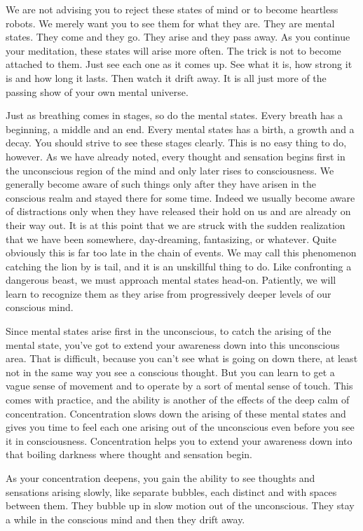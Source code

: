 We are not advising you to reject these states of mind or to become heartless
robots. We merely want you to see them for what they are. They are mental
states. They come and they go. They arise and they pass away. As you continue
your meditation, these states will arise more often. The trick is not to become
attached to them. Just see each one as it comes up. See what it is, how strong
it is and how long it lasts. Then watch it drift away. It is all just more of
the passing show of your own mental universe.

Just as breathing comes in stages, so do the mental states. Every breath has a
beginning, a middle and an end. Every mental states has a birth, a growth and a
decay. You should strive to see these stages clearly. This is no easy thing to
do, however. As we have already noted, every thought and sensation begins first
in the unconscious region of the mind and only later rises to consciousness.  We
generally become aware of such things only after they have arisen in the
conscious realm and stayed there for some time.  Indeed we usually become aware
of distractions only when they have released their hold on us and are already on
their way out. It is at this point that we are struck with the sudden
realization that we have been somewhere, day-dreaming, fantasizing, or whatever.
Quite obviously this is far too late in the chain of events. We may call this
phenomenon catching the lion by is tail, and it is an unskillful thing to do.
Like confronting a dangerous beast, we must approach mental states head-on.
Patiently, we will learn to recognize them as they arise from progressively
deeper levels of our conscious mind.

Since mental states arise first in the unconscious, to catch the arising of the
mental state, you've got to extend your awareness down into this unconscious
area. That is difficult, because you can't see what is going on down there, at
least not in the same way you see a conscious thought. But you can learn to get
a vague sense of movement and to operate by a sort of mental sense of touch.
This comes with practice, and the ability is another of the effects of the deep
calm of concentration. Concentration slows down the arising of these mental
states and gives you time to feel each one arising out of the unconscious even
before you see it in consciousness. Concentration helps you to extend your
awareness down into that boiling darkness where thought and sensation begin.

As your concentration deepens, you gain the ability to see thoughts and
sensations arising slowly, like separate bubbles, each distinct and with spaces
between them. They bubble up in slow motion out of the unconscious. They stay a
while in the conscious mind and then they drift away.

